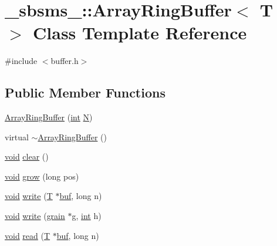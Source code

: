 \hypertarget{class__sbsms___1_1_array_ring_buffer}{}\section{\+\_\+sbsms\+\_\+\+:\+:Array\+Ring\+Buffer$<$ T $>$ Class Template Reference}
\label{class__sbsms___1_1_array_ring_buffer}


{\ttfamily \#include $<$buffer.\+h$>$}

\subsection*{Public Member Functions}
\begin{DoxyCompactItemize}
\item 
\hyperlink{class__sbsms___1_1_array_ring_buffer_abe757ccb1416e088ee8e846c64008987}{Array\+Ring\+Buffer} (\hyperlink{xmltok_8h_a5a0d4a5641ce434f1d23533f2b2e6653}{int} \hyperlink{class__sbsms___1_1_array_ring_buffer_aae8ab83bf76f0e11476f7859677c2c5b}{N})
\item 
virtual \hyperlink{class__sbsms___1_1_array_ring_buffer_aadfa83ed4a3fe3905e7bc2bf568a9268}{$\sim$\+Array\+Ring\+Buffer} ()
\item 
\hyperlink{sound_8c_ae35f5844602719cf66324f4de2a658b3}{void} \hyperlink{class__sbsms___1_1_array_ring_buffer_a28644b0931b7f46fd188b71ef796d67c}{clear} ()
\item 
\hyperlink{sound_8c_ae35f5844602719cf66324f4de2a658b3}{void} \hyperlink{class__sbsms___1_1_array_ring_buffer_acf106fffe922f19516e8d760ac48b4b5}{grow} (long pos)
\item 
\hyperlink{sound_8c_ae35f5844602719cf66324f4de2a658b3}{void} \hyperlink{class__sbsms___1_1_array_ring_buffer_a3168d8af374ea1133f11b6de5a9f1efd}{write} (\hyperlink{xmltchar_8h_a16a0f7e7053a679c9bf4289b441a2be7}{T} $\ast$\hyperlink{class__sbsms___1_1_array_ring_buffer_a78818bd9b32d5c8c6317112414e055ab}{buf}, long n)
\item 
\hyperlink{sound_8c_ae35f5844602719cf66324f4de2a658b3}{void} \hyperlink{class__sbsms___1_1_array_ring_buffer_a521143d09d7700b2405d106b6cc44143}{write} (\hyperlink{class__sbsms___1_1grain}{grain} $\ast$g, \hyperlink{xmltok_8h_a5a0d4a5641ce434f1d23533f2b2e6653}{int} h)
\item 
\hyperlink{sound_8c_ae35f5844602719cf66324f4de2a658b3}{void} \hyperlink{class__sbsms___1_1_array_ring_buffer_a195a5101f2d8b32ad7c47bf1786ded45}{read} (\hyperlink{xmltchar_8h_a16a0f7e7053a679c9bf4289b441a2be7}{T} $\ast$\hyperlink{class__sbsms___1_1_array_ring_buffer_a78818bd9b32d5c8c6317112414e055ab}{buf}, long n)

\end{DoxyCompactItemize}

